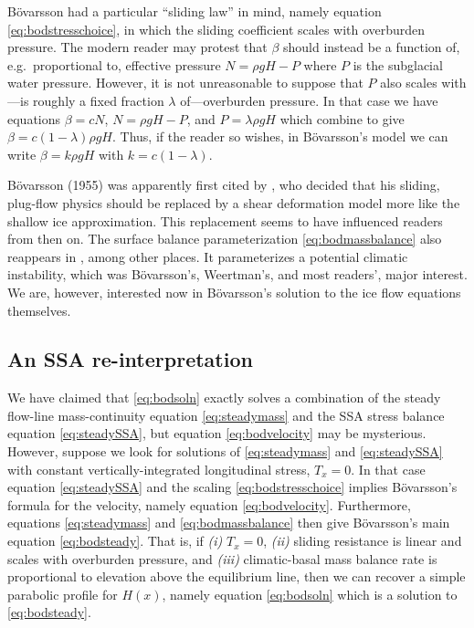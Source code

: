 \documentclass[twocolumn]{igs}
\renewcommand{\dh}{\fontencoding{T1}\selectfont{\symbol{240}}}
\newcommand{\bod}{B\"o\dh varsson\xspace}
\newcommand{\citebod}{B\"o\dh varsson (1955)\nocite{Bodvardsson}\xspace}
\begin{document}
\bod had a particular ``sliding law'' in mind, namely equation \eqref{eq:bodstresschoice}, in which the sliding coefficient scales with overburden pressure.  The modern reader may protest that $\beta$ should instead be a function of, e.g.~proportional to, effective pressure $N=\rho g H - P$ where $P$ is the subglacial water pressure.  However, it is not unreasonable to suppose that $P$ also scales with---is roughly a fixed fraction $\lambda$ of---overburden pressure.  In that case we have equations $\beta = c N$, $N=\rho g H - P$, and $P = \lambda \rho g H$ which combine to give $\beta = c (1-\lambda) \rho g H$.  Thus, if the reader so wishes, in \bod's model we can write $\beta = k \rho g H$ with $k=c (1-\lambda)$.

\citebod was apparently first cited by \cite{Weertman61stability}, who decided that his sliding, plug-flow physics should be replaced by a shear deformation model more like the shallow ice approximation.  This replacement seems to have influenced readers from then on.  The surface balance parameterization \eqref{eq:bodmassbalance} also reappears in \cite{Weertman61stability}, among other places.  It parameterizes a potential climatic instability, which was \bod's, Weertman's, and most readers', major interest.  We are, however, interested now in \bod's solution to the ice flow equations themselves.


\subsection*{An SSA re-interpretation}  We have claimed that \eqref{eq:bodsoln} exactly solves a combination of the steady flow-line mass-continuity equation \eqref{eq:steadymass} and the SSA stress balance equation \eqref{eq:steadySSA}, but equation \eqref{eq:bodvelocity} may be mysterious.  However, suppose we look for solutions of \eqref{eq:steadymass} and \eqref{eq:steadySSA} with constant vertically-integrated longitudinal stress, $T_x = 0$.  In that case equation \eqref{eq:steadySSA} and the scaling \eqref{eq:bodstresschoice} implies \bod's formula for the velocity, namely equation \eqref{eq:bodvelocity}.  Furthermore, equations \eqref{eq:steadymass} and \eqref{eq:bodmassbalance} then give \bod's main equation \eqref{eq:bodsteady}.  That is, if \emph{(i)} $T_x = 0$, \emph{(ii)} sliding resistance is linear and scales with overburden pressure, and \emph{(iii)} climatic-basal mass balance rate is proportional to elevation above the equilibrium line, then we can recover a simple parabolic profile for $H(x)$, namely equation \eqref{eq:bodsoln} which is a solution to \eqref{eq:bodsteady}.
\end{document}
